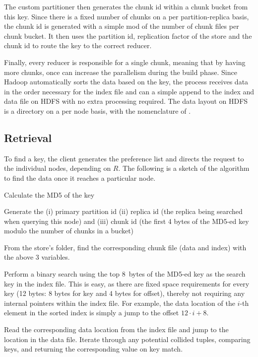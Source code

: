 The custom partitioner then generates the chunk id within a chunk
bucket from this key. Since there is a fixed number of chunks on a 
per partition-replica basis, the chunk id is generated with a 
simple mod of the number of chunk files per chunk bucket. 
It then uses the partition id, replication factor of the store and 
the chunk id to route the key to the correct reducer. 

Finally, every reducer is responsible for a single chunk, 
meaning that by having more chunks, once can increase
the parallelism during the build phase. Since Hadoop automatically
sorts the data based on the key, the process receives data in the
order necessary for the index file and can a simple append 
to the index and data file on HDFS with no extra processing required.
The data layout on HDFS is a directory on a per \projectname{} node
basis, with the nomenclature of .


\subsection{Retrieval}
\label{sec:read_only:search}

To find a key, the client generates the preference list and directs
the request to the individual nodes, depending on $R$. 
The following is a sketch of the algorithm to find the data once it
reaches a particular node.

\begin{compactenum}
  \item Calculate the MD5 of the key
  \item Generate the (i) primary partition id (ii) replica id (the replica being
searched when querying this node) and (iii) chunk id (the first 4 bytes of
the MD5-ed key modulo the number of chunks in a bucket)
  \item From the store's folder, find the corresponding chunk file 
(data and index) with the above 3 variables.
  \item Perform a binary search using the top 8~bytes of the MD5-ed
key as the search key in the index file. This is easy, as there are
fixed space requirements for every key (12 bytes: 8 bytes for key and
4 bytes for offset), thereby not requiring any internal pointers
within the index file. For example, the data location of the $i$-th
element in the sorted index is simply a jump to
the offset $12 \cdot i + 8$.  
  \item Read the corresponding data location from the index file
and jump to the location in the data file. Iterate through any 
potential collided tuples, comparing keys, and returning the 
corresponding value on key match. 
\end{compactenum}

